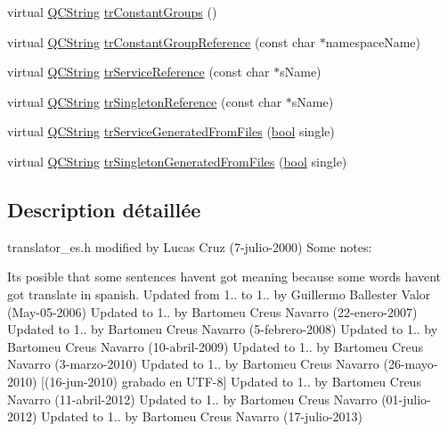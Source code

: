 \begin{DoxyCompactItemize}
\item 
virtual \hyperlink{class_q_c_string}{Q\+C\+String} \hyperlink{class_translator_spanish_a31fa0648138444dc75bef6b0ebdb0ed6}{tr\+Constant\+Groups} ()
\item 
virtual \hyperlink{class_q_c_string}{Q\+C\+String} \hyperlink{class_translator_spanish_a433eaf197d8eaacacf1259df0359e4c8}{tr\+Constant\+Group\+Reference} (const char $\ast$namespace\+Name)
\item 
virtual \hyperlink{class_q_c_string}{Q\+C\+String} \hyperlink{class_translator_spanish_a64711bb59017c8079509170923f25d0d}{tr\+Service\+Reference} (const char $\ast$s\+Name)
\item 
virtual \hyperlink{class_q_c_string}{Q\+C\+String} \hyperlink{class_translator_spanish_a8b03e8d1f3721c3e5863b29d9815e728}{tr\+Singleton\+Reference} (const char $\ast$s\+Name)
\item 
virtual \hyperlink{class_q_c_string}{Q\+C\+String} \hyperlink{class_translator_spanish_a6106aff44f7f1eb6263703ae3268c188}{tr\+Service\+Generated\+From\+Files} (\hyperlink{qglobal_8h_a1062901a7428fdd9c7f180f5e01ea056}{bool} single)
\item 
virtual \hyperlink{class_q_c_string}{Q\+C\+String} \hyperlink{class_translator_spanish_a2be1aea6ce5052982cd185fb6c3979d0}{tr\+Singleton\+Generated\+From\+Files} (\hyperlink{qglobal_8h_a1062901a7428fdd9c7f180f5e01ea056}{bool} single)
\end{DoxyCompactItemize}


\subsection{Description détaillée}
translator\+\_\+es.\+h modified by Lucas Cruz (7-\/julio-\/2000) Some notes\+:
\begin{DoxyItemize}
\item It\textquotesingle{}s posible that some sentences haven\textquotesingle{}t got meaning because some words haven\textquotesingle{}t got translate in spanish. Updated from 1.. to 1.. by Guillermo Ballester Valor (May-\/05-\/2006) Updated to 1.. by Bartomeu Creus Navarro (22-\/enero-\/2007) Updated to 1.. by Bartomeu Creus Navarro (5-\/febrero-\/2008) Updated to 1.. by Bartomeu Creus Navarro (10-\/abril-\/2009) Updated to 1.. by Bartomeu Creus Navarro (3-\/marzo-\/2010) Updated to 1.. by Bartomeu Creus Navarro (26-\/mayo-\/2010) \mbox{[}(16-\/jun-\/2010) grabado en U\+T\+F-\/8\mbox{]} Updated to 1.. by Bartomeu Creus Navarro (11-\/abril-\/2012) Updated to 1.. by Bartomeu Creus Navarro (01-\/julio-\/2012) Updated to 1.. by Bartomeu Creus Navarro (17-\/julio-\/2013) 
\end{DoxyItemize}

